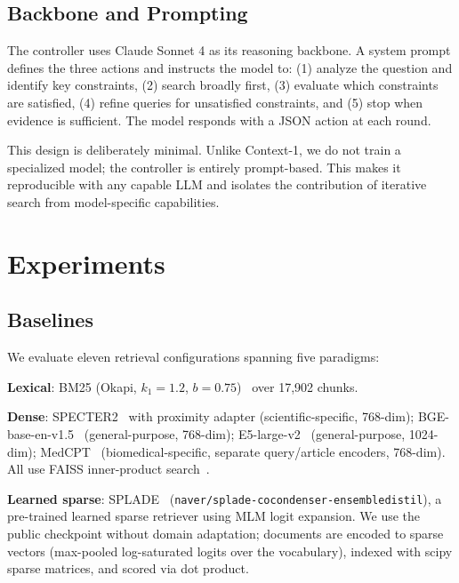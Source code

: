 \documentclass{article}
\begin{document}
\subsection{Backbone and Prompting}

The controller uses Claude Sonnet 4 as its reasoning backbone. A system prompt defines the three actions and instructs the model to: (1) analyze the question and identify key constraints, (2) search broadly first, (3) evaluate which constraints are satisfied, (4) refine queries for unsatisfied constraints, and (5) stop when evidence is sufficient. The model responds with a JSON action at each round.

This design is deliberately minimal. Unlike Context-1, we do not train a specialized model; the controller is entirely prompt-based. This makes it reproducible with any capable LLM and isolates the contribution of iterative search from model-specific capabilities.

\section{Experiments}
\label{sec:experiments}

\subsection{Baselines}

We evaluate eleven retrieval configurations spanning five paradigms:

\textbf{Lexical}: BM25 (Okapi, $k_1{=}1.2$, $b{=}0.75$)~\cite{robertson2009} over 17,902 chunks.

\textbf{Dense}: SPECTER2~\cite{specter2} with proximity adapter (scientific-specific, 768-dim); BGE-base-en-v1.5~\cite{bge2024} (general-purpose, 768-dim); E5-large-v2~\cite{e52022} (general-purpose, 1024-dim); MedCPT~\cite{medcpt2023} (biomedical-specific, separate query/article encoders, 768-dim). All use FAISS inner-product search~\cite{johnson2019faiss}.

\textbf{Learned sparse}: SPLADE~\cite{splade2022} (\texttt{naver/splade-\allowbreak cocondenser-\allowbreak ensembledistil}), a pre-trained learned sparse retriever using MLM logit expansion. We use the public checkpoint without domain adaptation; documents are encoded to sparse vectors (max-pooled log-saturated logits over the vocabulary), indexed with scipy sparse matrices, and scored via dot product.
\end{document}
